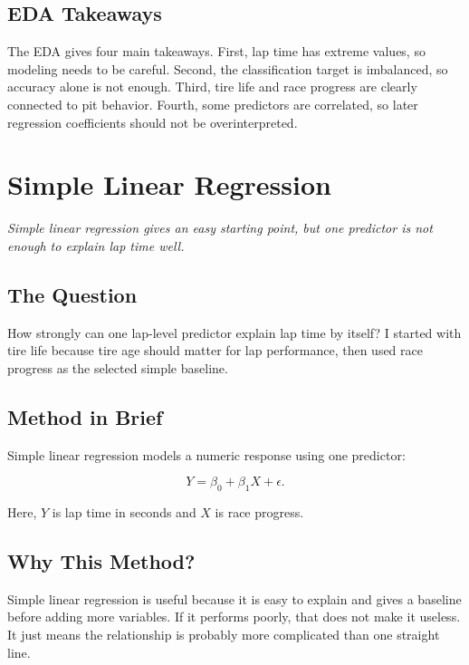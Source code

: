\documentclass[11pt,oneside,openany]{book}
\newcommand{\chapterquote}[1]{%
\begin{center}
\small\textit{#1}
\end{center}
\vspace{-0.5em}
}
\begin{document}
\section{EDA Takeaways}

The EDA gives four main takeaways. First, lap time has extreme values, so modeling needs to be careful. Second, the classification target is imbalanced, so accuracy alone is not enough. Third, tire life and race progress are clearly connected to pit behavior. Fourth, some predictors are correlated, so later regression coefficients should not be overinterpreted.


\chapter{Simple Linear Regression}
\chapterquote{Simple linear regression gives an easy starting point, but one predictor is not enough to explain lap time well.}

\section{The Question}

How strongly can one lap-level predictor explain lap time by itself? I started with tire life because tire age should matter for lap performance, then used race progress as the selected simple baseline.

\section{Method in Brief}

Simple linear regression models a numeric response using one predictor:

\[
Y = \beta_0 + \beta_1X + \epsilon.
\]

Here, \(Y\) is lap time in seconds and \(X\) is race progress.

\section{Why This Method?}

Simple linear regression is useful because it is easy to explain and gives a baseline before adding more variables. If it performs poorly, that does not make it useless. It just means the relationship is probably more complicated than one straight line.
\end{document}

